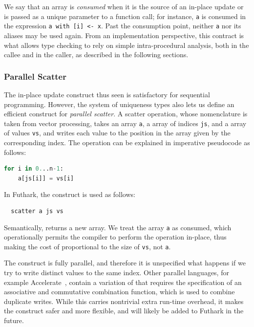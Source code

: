We say that an array is \textit{consumed} when it is the source of an
in-place update or is passed as a unique parameter to a function call;
for instance, \lstinline{a} is consumed in the expression
\mbox{\lstinline{a with [i] <- x}}.  Past the consumption point,
neither \lstinline{a} nor its aliases may be used again.  From an
implementation perspective, this contract is what allows type checking
to rely on simple intra-procedural analysis, both in the callee and in
the caller, as described in the following sections.

\subsubsection{Parallel Scatter}

The in-place update construct thus seen is satisfactory for sequential
programming.  However, the system of uniqueness types also lets us
define an efficient construct for \textit{parallel scatter}.  A
scatter operation, whose nomenclature is taken from vector processing,
takes an array \lstinline{a}, a array of indices \lstinline{js},
and a array of values \lstinline{vs}, and writes each value to the
position in the array given by the corresponding index.  The operation
can be explained in imperative pseudocode as follows:

\begin{lstlisting}[language=Python]
  for i in 0...n-1:
    a[js[i]] = vs[i]
\end{lstlisting}

\noindent In Futhark, the  construct is used as follows:

\begin{lstlisting}
  scatter a js vs
\end{lstlisting}

Semantically,  returns a new array.  We treat the array
\lstinline{a} as consumed, which operationally permits the compiler to
perform the operation in-place, thus making the cost of 
proportional to the size of \lstinline{vs}, not \lstinline{a}.

The  construct is fully parallel, and therefore it is
unspecified what happens if we try to write distinct values to the
same index.  Other parallel languages, for example
Accelerate~\cite{mcdonell2013optimising}, contain a variation of
 that requires the specification of an associative and
commutative combination function, which is used to combine duplicate
writes.  While this carries nontrivial extra run-time overhead, it
makes the construct safer and more flexible, and will likely be added
to Futhark in the future.

